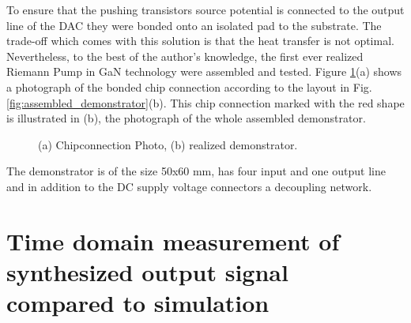 \documentclass[journal]{IEEEtran}
\begin{document}
To ensure that the pushing transistors source potential is connected to the output line of the DAC they were bonded onto an isolated pad to the substrate.
The trade-off which comes with this solution is that the heat transfer is not optimal.\\
Nevertheless, to the best of the author's knowledge, the first ever realized Riemann Pump in GaN technology were assembled and tested.
Figure \ref{fig:photo_chipconnection_demonstrator}(a) shows a photograph of the bonded chip connection according to the layout in Fig. \ref{fig:assembled_demonstrator}(b).
This chip connection marked with the red shape is illustrated in (b), the photograph of the whole assembled demonstrator.
\begin{figure}[htb]
  \centering
	\begin{scriptsize}
  	\def\svgwidth{\columnwidth}
 	 
  	\caption{(a) Chipconnection Photo, (b) realized demonstrator.}
  	\label{fig:photo_chipconnection_demonstrator}
	\end{scriptsize}
\end{figure}
The demonstrator is of the size 50x60 mm, has four input and one output line and in addition to the DC supply voltage connectors a decoupling network.
%
\section{Time domain measurement of synthesized output signal compared to simulation}
\label{sec:experiment}
\end{document}
